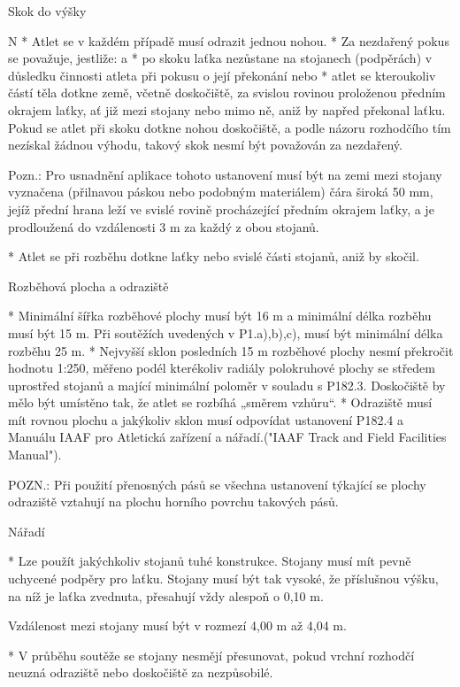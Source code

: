 \secc Skok do výšky

\begitems \style N
* Atlet se v každém případě musí odrazit jednou nohou.
* Za nezdařený pokus se považuje, jestliže:
  \begitems \style a
  * po skoku laťka nezůstane na stojanech (podpěrách) v důsledku činnosti atleta při pokusu o její překonání nebo
  * atlet se kteroukoliv částí těla dotkne země, včetně doskočiště, za svislou rovinou proloženou předním okrajem laťky, ať již mezi stojany nebo mimo ně, aniž by napřed překonal laťku. Pokud se atlet při skoku dotkne nohou doskočiště, a podle názoru rozhodčího tím nezískal žádnou výhodu, takový skok nesmí být považován za nezdařený.

  Pozn.: Pro usnadnění aplikace tohoto ustanovení musí být na zemi mezi stojany vyznačena (přilnavou páskou nebo podobným materiálem) čára široká 50 mm, jejíž přední hrana leží ve svislé rovině procházející předním okrajem laťky, a je prodloužená do vzdálenosti 3 m za každý z obou stojanů.

  * Atlet se při rozběhu dotkne laťky nebo svislé části stojanů, aniž by skočil.
  \enditems

Rozběhová plocha a odraziště

* Minimální šířka rozběhové plochy musí být 16 m a minimální délka rozběhu musí být 15 m. Při soutěžích uvedených v P1.a),b),c), musí být minimální délka rozběhu 25 m.
* Nejvyšší sklon posledních 15 m rozběhové plochy nesmí překročit hodnotu 1:250, měřeno podél kterékoliv radiály polokruhové plochy se středem uprostřed stojanů a mající minimální poloměr v souladu s P182.3. Doskočiště by mělo být umístěno tak, že atlet se rozbíhá „směrem vzhůru“.
* Odraziště musí mít rovnou plochu a jakýkoliv sklon musí odpovídat ustanovení P182.4 a Manuálu IAAF pro Atletická zařízení a nářadí.("IAAF Track and Field Facilities Manual").

POZN.: Při použití přenosných pásů se všechna ustanovení týkající se plochy odraziště vztahují na plochu horního povrchu takových pásů.

Nářadí

* Lze použít jakýchkoliv stojanů tuhé konstrukce. Stojany musí mít pevně uchycené podpěry pro laťku. Stojany musí být tak vysoké, že příslušnou výšku, na níž je laťka zvednuta, přesahují vždy alespoň o 0,10 m.

Vzdálenost mezi stojany musí být v rozmezí 4,00 m až 4,04 m.

* V průběhu soutěže se stojany nesmějí přesunovat, pokud vrchní rozhodčí neuzná odraziště nebo doskočiště za nezpůsobilé.

